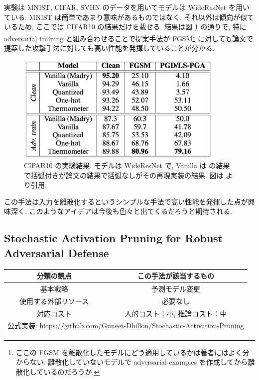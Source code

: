 実験は MNIST, CIFAR, SVHN のデータを用いてモデルは WideResNet を用いている.
MNIST は簡単であまり意味があるものではなく, それ以外は傾向が似ているため, ここでは CIFAR10 の結果だけを載せる.
結果は図 \ref{fig:thermometer-encoding-cifar10} の通りで, 特に adversarial training と組み合わせることで提案手法が FGSM\footnote{
ここの FGSM を離散化したモデルにどう適用しているかは著者にはよく分からない.
離散化していないモデルで adversarial examples を作成してから離散化しているのだろうか.
} に対しても論文で提案した攻撃手法に対しても高い性能を発揮していることが分かる.
%
\begin{figure}[htbp]
\begin{center}
\includegraphics[width=10.0cm]{figures/thermometer-encoding-cifar10.pdf}
\end{center}
\caption{
CIFAR10 の実験結果.
モデルは WideResNet で, Vanilla は \cite{madry2017towards} の結果で括弧付きが論文の結果で括弧なしがその再現実装の結果.
図は \cite{buckman2018thermometer} より引用.
}
\label{fig:thermometer-encoding-cifar10}
\end{figure}
%

この手法は入力を離散化するというシンプルな手法で高い性能を発揮した点が興味深く, このようなアイデアは今後も色々と出てくるだろうと期待される.



\subsection{Stochastic Activation Pruning for Robust Adversarial Defense}
\label{subsec:stochastic-activation}
%
\begin{table}[htbp]
\begin{center}
\begin{tabular}{|c|c|}
\hline
分類の観点 & この手法が該当するもの \\
\hline
基本戦略 & 予測モデル変更 \\
使用する外部リソース & 必要なし \\
対応コスト & 人的コスト：小, 推論コスト：中 \\
\hline
\multicolumn{2}{|c|}{公式実装: \href{https://github.com/Guneet-Dhillon/Stochastic-Activation-Pruning}{https://github.com/Guneet-Dhillon/Stochastic-Activation-Pruning}} \\
\hline
\end{tabular}
\label{tb:stochastic-activation-summary}
\end{center}
\end{table}
%

